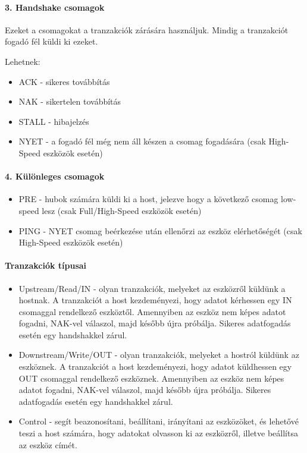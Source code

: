 \paragraph{3. Handshake csomagok}

Ezeket a csomagokat a tranzakciók zárására használjuk. Mindig a tranzakciót fogadó fél küldi ki ezeket.

Lehetnek:

\begin{itemize}
	\item ACK - sikeres továbbítás
	\item NAK - sikertelen továbbítás
	\item STALL - hibajelzés
	\item NYET - a fogadó fél még nem áll készen a csomag fogadására (csak High-Speed eszközök esetén)
\end{itemize}

\paragraph{4. Különleges csomagok}

\begin{itemize}
	\item PRE - hubok számára küldi ki a host, jelezve hogy a következő csomag low-speed lesz (csak Full/High-Speed eszközök esetén)
	\item PING - NYET csomag beérkezése után ellenőrzi az eszköz elérhetőségét (csak High-Speed eszközök esetén)
\end{itemize}

\paragraph{Tranzakciók típusai}

\begin{itemize}
	\item Upstream/Read/IN - olyan tranzakciók, melyeket az eszközről küldünk a hostnak. A tranzakciót a host kezdeményezi, hogy adatot kérhessen egy IN csomaggal rendelkező eszköztől. Amennyiben az eszköz nem képes adatot fogadni, NAK-vel válaszol, majd később újra próbálja. Sikeres adatfogadás esetén egy handshakkel zárul.
	\item Downstream/Write/OUT - olyan tranzakciók, melyeket a hostról küldünk az eszköznek. A tranzakciót a host kezdeményezi, hogy adatot küldhessen egy OUT csomaggal rendelkező eszköznek. Amennyiben az eszköz nem képes adatot fogadni, NAK-vel válaszol, majd később újra próbálja. Sikeres adatfogadás esetén egy handshakkel zárul.
	\item Control - segít beazonosítani, beállítani, irányítani az eszközöket, és lehetővé teszi a host számára, hogy adatokat olvasson ki az eszközről, illetve beállítsa az eszköz címét.
\end{itemize}

